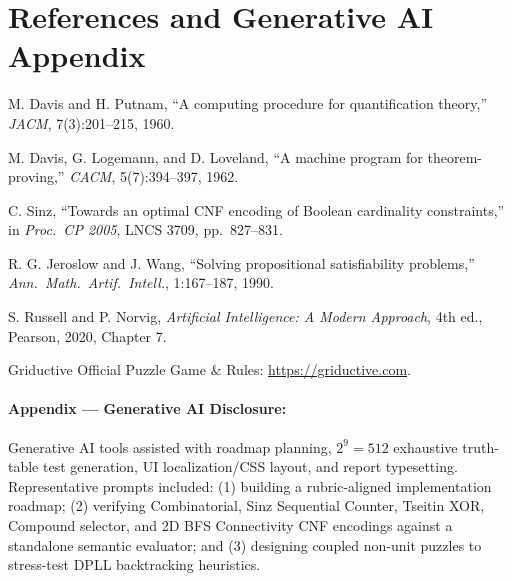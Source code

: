 \documentclass[11pt,a4paper]{article}
\begin{document}
\section{References and Generative AI Appendix}
\begin{enumerate}[nosep,label={[\arabic*]}]
    \item M. Davis and H. Putnam, ``A computing procedure for quantification theory,'' \emph{JACM}, 7(3):201--215, 1960.
    \item M. Davis, G. Logemann, and D. Loveland, ``A machine program for theorem-proving,'' \emph{CACM}, 5(7):394--397, 1962.
    \item C. Sinz, ``Towards an optimal CNF encoding of Boolean cardinality constraints,'' in \emph{Proc.\ CP 2005}, LNCS 3709, pp.\ 827--831.
    \item R. G. Jeroslow and J. Wang, ``Solving propositional satisfiability problems,'' \emph{Ann.\ Math.\ Artif.\ Intell.}, 1:167--187, 1990.
    \item S. Russell and P. Norvig, \emph{Artificial Intelligence: A Modern Approach}, 4th ed., Pearson, 2020, Chapter 7.
    \item Griductive Official Puzzle Game \& Rules: \url{https://griductive.com}.
\end{enumerate}

\paragraph{Appendix — Generative AI Disclosure:} Generative AI tools assisted with roadmap planning, $2^9 = 512$ exhaustive truth-table test generation, UI localization/CSS layout, and report typesetting. Representative prompts included: (1) building a rubric-aligned implementation roadmap; (2) verifying Combinatorial, Sinz Sequential Counter, Tseitin XOR, Compound selector, and 2D BFS Connectivity CNF encodings against a standalone semantic evaluator; and (3) designing coupled non-unit puzzles to stress-test DPLL backtracking heuristics.
\end{document}
